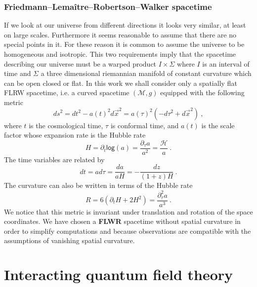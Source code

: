 \documentclass[11pt]{book}
\renewcommand{\log}{\mathsf{log}}
\newcommand{\Hcal}{\mathcal{H}}
\newcommand{\Mcal}{\mathcal{M}}
\theoremstyle{break}
\begin{document}
\subsection{Friedmann--Lemaître--Robertson--Walker spacetime}
\label{p:FLRW}


If we look at our universe from different directions it looks very similar, at least on large scales. Furthermore it seems reasonable to assume that there are no special points in it. For these reason it is common to assume the universe to be homogeneous and isotropic. This two requirements imply that the spacetime describing our universe must be a warped product $I\times \Sigma$ where $I$ is an interval of time and $\Sigma$ a three dimensional riemannian manifold of constant curvature which can be open closed or flat. In this work we shall consider only a spatially flat FLRW spacetime, i.e. a curved spacetime $(\Mcal,g)$ equipped with the following metric
%
\begin{equation*}
ds^2 = dt^2 - a(t)^2 d\vec{x}^2 = a(\tau)^2\left(-d\tau^2+d\vec{x}^2\right) \ ,
\end{equation*}
%
where $t$ is the cosmological time, $\tau$ is conformal time, and $a(t)$ is the scale factor whose expansion rate is the Hubble rate
%
\begin{equation*}
H = \partial_t \log (a) = \frac{\partial_\tau a}{a^2} = \frac{\Hcal}{a} \ .
\end{equation*}
%
The time variables are related by
%
\begin{equation*}
dt = a d\tau = \frac{da}{aH} = -\frac{dz}{(1+z)H} \ . 
\end{equation*}
% 
The curvature can also be written in terms of the Hubble rate
%
\begin{equation}
R=6(\partial_t H + 2 H^2)=\frac{\partial^2_\tau a}{a^3} \ . 
\label{eq:rflrw}
\end{equation}
%
We notice that this metric is invariant under translation and rotation of the space coordinates. We have chosen a \textbf{FLWR} spacetime without spatial curvature in order to simplify computations and because observations are compatible with the assumptions of vanishing spatial curvature. 

\chapter{Interacting quantum field theory}
\label{p:INT_QFT}
\end{document}
